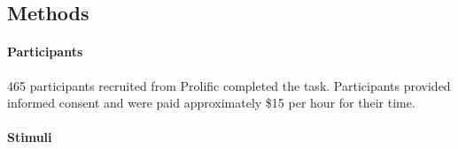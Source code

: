 \documentclass[10pt,letterpaper]{article}
\begin{document}
% 




\subsection{Methods}

\paragraph{Participants}
465 participants recruited from Prolific completed the task. 
Participants provided informed consent and were paid approximately \$15 per hour for their time.

\paragraph{Stimuli} 


\end{document}
